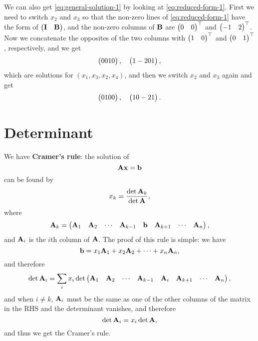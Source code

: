 \documentclass[hyperref, a4paper]{article}
\newcommand*{\concept}[1]{{\textbf{#1}}}
\def\\{}%
\newcommand*{\mat}[1]{\vb{#1}}
\begin{document}
We can also get \eqref{eq:general-solution-1} by looking at \eqref{eq:reduced-form-1}.
First we need to switch $x_2$ and $x_3$ so that the non-zero lines of \eqref{eq:reduced-form-1}
have the form of $\pmqty{\mat{I} & \mat{B}}$,
and the non-zero columns of $\mat{B}$ are 
$\pmqty{0 & 0}^\top$ and $\pmqty{-1 & 2}^\top$.
Now we concatenate the opposites of the two columns 
with $\pmqty{1 & 0}^\top$ and $\pmqty{0 & 1}^\top$, respectively,
and we get 
\[
    \pmqty{0 \\ 0 \\ 1 \\ 0}, \quad \pmqty{1 \\ -2 \\ 0 \\ 1},
\]
which are solutions for $(x_1, x_3, x_2, x_4)$,
and then we switch $x_2$ and $x_3$ again and get 
\[
    \pmqty{0 \\ 1 \\ 0 \\ 0}, \quad \pmqty{1 \\ 0 \\ -2 \\ 1}.
\]

\section{Determinant}

We have \concept{Cramer's rule}: 
the solution of 
\begin{equation}
    \mat{A} \vb{x} = \mat{b}
\end{equation}
can be found by 
\begin{equation}
    x_k = \frac{\det \mat{A}_{k}}{\det \mat{A}},
\end{equation}
where 
\begin{equation}
    \mat{A}_k = \pmqty{\vb{A}_1 & \vb{A}_2 & \cdots & \vb{A}_{k-1} & \vb{b} & \vb{A}_{k+1} & \cdots & \vb{A}_n},
\end{equation}
and $\vb{A}_i$ is the $i$th column of $\mat{A}$.
The proof of this rule is simple: 
we have
\[
    \vb{b} = x_1 \vb{A}_1 + x_2 \vb{A}_2 + \cdots + x_n \vb{A}_n,
\]
and therefore 
\[
    \det \mat{A}_i = \sum_{i} x_i \det \pmqty{\vb{A}_1 & \vb{A}_2 & \cdots & \vb{A}_{k-1} & \vb{A}_i & \vb{A}_{k+1} & \cdots & \vb{A}_n},
\]
and when $i \neq k$, 
$\vb{A}_i$ must be the same as one of the other columns of the matrix in the RHS 
and the determinant vanishes, 
and therefore 
\[
    \det \mat{A}_i = x_i \det \mat{A},
\]
and thus we get the Cramer's rule.
\end{document}
